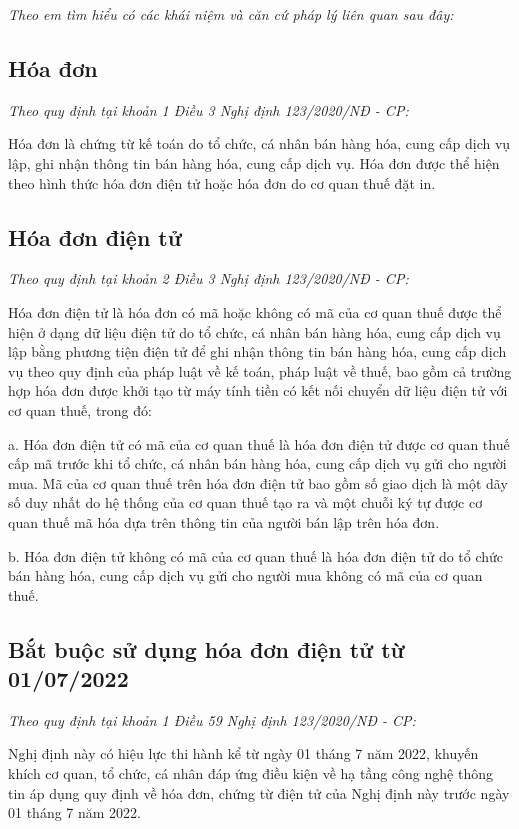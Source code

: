 \emph{Theo em tìm hiểu có các khái niệm và căn cứ pháp lý liên quan sau đây:}

\subsection{Hóa đơn}

\emph{Theo quy định tại khoản 1 Điều 3 Nghị định 123/2020/NĐ - CP:}


Hóa đơn là chứng từ kế toán do tổ chức, cá nhân bán hàng hóa, cung cấp dịch vụ lập, ghi nhận thông tin bán hàng hóa, cung cấp dịch vụ. Hóa đơn được thể hiện theo hình thức hóa đơn điện tử hoặc hóa đơn do cơ quan thuế đặt in.


\subsection{Hóa đơn điện tử}

\emph{Theo quy định tại khoản 2 Điều 3 Nghị định 123/2020/NĐ - CP:}


Hóa đơn điện tử là hóa đơn có mã hoặc không có mã của cơ quan thuế được thể hiện ở dạng dữ liệu điện tử do tổ chức, cá nhân bán hàng hóa, cung cấp dịch vụ lập bằng phương tiện điện tử để ghi nhận thông tin bán hàng hóa, cung cấp dịch vụ theo quy định của pháp luật về kế toán, pháp luật về thuế, bao gồm cả trường hợp hóa đơn được khởi tạo từ máy tính tiền có kết nối chuyển dữ liệu điện tử với cơ quan thuế, trong đó:

a. Hóa đơn điện tử có mã của cơ quan thuế là hóa đơn điện tử được cơ quan thuế cấp mã trước khi tổ chức, cá nhân bán hàng hóa, cung cấp dịch vụ gửi cho người mua. Mã của cơ quan thuế trên hóa đơn điện tử bao gồm số giao dịch là một dãy số duy nhất do hệ thống của cơ quan thuế tạo ra và một chuỗi ký tự được cơ quan thuế mã hóa dựa trên thông tin của người bán lập trên hóa đơn.

b. Hóa đơn điện tử không có mã của cơ quan thuế là hóa đơn điện tử do tổ chức bán hàng hóa, cung cấp dịch vụ gửi cho người mua không có mã của cơ quan thuế.


\subsection{Bắt buộc sử dụng hóa đơn điện tử từ 01/07/2022}

\emph{Theo quy định tại khoản 1 Điều 59 Nghị định 123/2020/NĐ - CP:}


Nghị định này có hiệu lực thi hành kể từ ngày 01 tháng 7 năm 2022, khuyến khích cơ quan, tổ chức, cá nhân đáp ứng điều kiện về hạ tầng công nghệ thông tin áp dụng quy định về hóa đơn, chứng từ điện tử của Nghị định này trước ngày 01 tháng 7 năm 2022.



